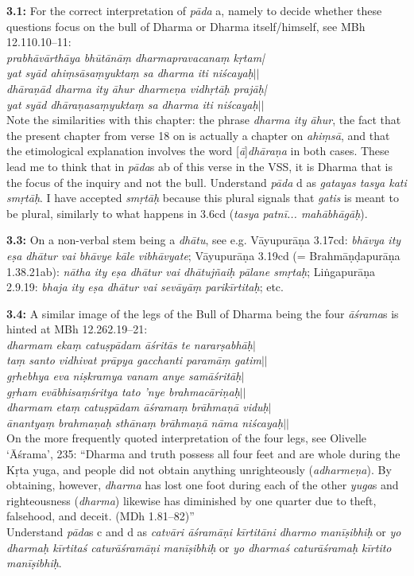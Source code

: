 \documentclass{article}
\newcommand{\vsnum}[1]{\textbf{#1}}
\newcommand{\skt}[1]{\textit{#1}}
\begin{document}
\vsnum{3.1: }For the correct interpretation of \skt{pāda} a, namely to decide whether these questions focus on the bull of Dharma or Dharma itself/himself, see MBh 12.110.10--11: \\ \skt{prabhāvārthāya bhūtānāṃ dharmapravacanaṃ kṛtam|\\ yat syād ahiṃsāsaṃyuktaṃ sa dharma iti niścayaḥ$||$\\ dhāraṇād dharma ity āhur dharmeṇa vidhṛtāḥ prajāḥ|\\ yat syād dhāraṇasaṃyuktaṃ sa dharma iti niścayaḥ$||$} \\ Note the similarities with this chapter: the phrase \skt{dharma ity āhur}, the fact that the present chapter from verse 18 on is actually a chapter on \skt{ahiṃsā}, and that the etimological explanation involves the word [\skt{ā}]\skt{dhāraṇa} in both cases. These lead me to think that in \skt{pāda}s ab of this verse in the VSS, it is Dharma that is the focus of the inquiry and not the bull. Understand \skt{pāda} d as \skt{gatayas tasya kati smṛtāḥ}. I have accepted \skt{smṛtāḥ} because this plural signals that \skt{gatis} is meant to be plural, similarly to what happens in 3.6cd (\skt{tasya patnī... mahābhāgāḥ}).

\vsnum{3.3: }On a non-verbal stem being a \skt{dhātu}, see e.g. Vāyupurāṇa 3.17cd: \skt{bhāvya ity eṣa dhātur vai bhāvye kāle vibhāvyate}; Vāyupurāṇa 3.19cd (= Brahmāṇḍapurāṇa 1.38.21ab): \skt{nātha ity eṣa dhātur vai dhātujñaiḥ pālane smṛtaḥ}; Liṅgapurāṇa 2.9.19: \skt{bhaja ity eṣa dhātur vai sevāyāṃ parikīrtitaḥ}; etc.

\vsnum{3.4: }A similar image of the legs of the Bull of Dharma being the four \skt{āśrama}s is hinted at MBh 12.262.19--21: \\ \skt{dharmam{ }ekaṃ catuṣpādam{ }āśritās{ }te nararṣabhāḥ$|$\\taṃ santo vidhivat{ }prāpya gacchanti paramāṃ gatim$||$ \\gṛhebhya eva niṣkramya vanam{ }anye samāśritāḥ$|$\\gṛham{ }evābhisaṃśritya tato 'nye brahmacāriṇaḥ$||$ \\dharmam{ }etaṃ catuṣpādam{ }āśramaṃ brāhmaṇā viduḥ$|$\\ānantyaṃ brahmaṇaḥ sthānaṃ brāhmaṇā nāma niścayaḥ$||$} \\ On the more frequently quoted interpretation of the four legs, see Olivelle `Āśrama', 235: ``Dharma and truth possess all four feet and are whole during the Kṛta yuga, and people did not obtain anything unrighteously (\skt{adharmeṇa}). By obtaining, however, \skt{dharma} has lost one foot during each of the other \skt{yuga}s and righteousness (\skt{dharma}) likewise has diminished by one quarter due to theft, falsehood, and deceit. (MDh 1.81--82)'' \\ Understand \skt{pāda}s c and d as \skt{catvāri āśramāṇi kīrtitāni dharmo manīṣibhiḥ} or \skt{yo dharmaḥ kīrtitaś caturāśramāṇi manīṣibhiḥ} or \skt{yo dharmaś caturāśramaḥ kīrtito manīṣibhiḥ}.
\end{document}
